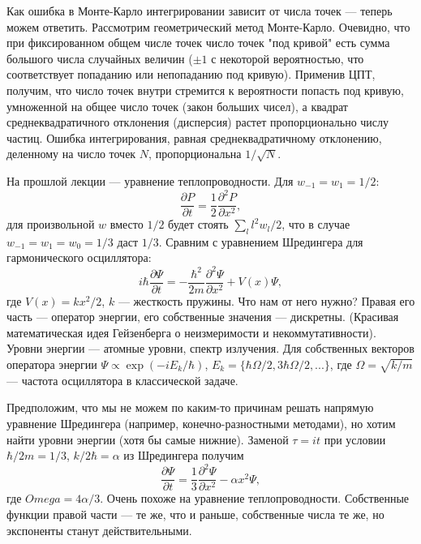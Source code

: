 \documentclass{book}
\begin{document}
Как ошибка в Монте-Карло интегрировании зависит от числа точек --- теперь можем ответить.
Рассмотрим геометрический метод Монте-Карло. Очевидно, что при фиксированном общем числе точек
число точек "под кривой" есть сумма большого числа случайных величин ($\pm 1$ с некоторой вероятностью, что
соответствует попаданию или непопаданию под кривую). Применив ЦПТ, получим, что число точек внутри
стремится к вероятности попасть под кривую, умноженной на общее число точек (закон больших чисел), а квадрат
среднеквадратичного отклонения (дисперсия) растет пропорционально числу частиц. Ошибка
интегрирования, равная среднеквадратичному отклонению, деленному на число точек $N$,
пропорциональна $1 / \sqrt{N}$.

На прошлой лекции --- уравнение теплопроводности. Для $w_{-1} = w_1 = 1/2$:
\begin{equation}
    \frac{\partial P}{\partial t} = \frac{1}{2} \frac{\partial^2 P}{\partial x^2},
\end{equation}
для произвольной $w$ вместо $1/2$ будет стоять $\sum_l l^2 w_l / 2$, что в случае $w_{-1} = w_1 =
w_0 = 1/3$ даст $1/3$. Сравним с уравнением Шредингера для гармонического осциллятора:
\begin{equation}
    i \hbar \frac{\partial \Psi}{\partial t} = - \frac{\hbar^2}{2 m} \frac{\partial^2 \Psi}{\partial x^2} + V(x) \Psi,
\end{equation}
где $V(x) = k x^2 / 2$, $k$ --- жесткость пружины.
Что нам от него нужно? Правая его часть --- оператор энергии, его собственные значения ---
дискретны. (Красивая математическая идея Гейзенберга о неизмеримости и некоммутативности). Уровни
энергии --- атомные уровни, спектр излучения. Для собственных векторов оператора энергии $\Psi
\propto \exp(-i E_k / \hbar)$, $E_k = \{\hbar \Omega / 2, 3 \hbar \Omega / 2, ...\}$, где $\Omega =
\sqrt{k / m}$ --- частота осциллятора в классической задаче.

Предположим, что мы не можем по каким-то причинам решать напрямую уравнение Шредингера (например,
конечно-разностными методами), но хотим найти уровни энергии (хотя бы самые нижние). Заменой $\tau
= i t$ при условии $\hbar / 2 m = 1 / 3$, $k / 2 \hbar = \alpha$ из Шредингера получим
\begin{equation}
    \frac{\partial \Psi}{\partial t} = \frac{1}{3} \frac{\partial^2 \Psi}{\partial x^2} - \alpha
    x^2 \Psi,
\end{equation}
где $Omega = 4 \alpha / 3$.
Очень похоже на уравнение теплопроводности.
Собственные функции правой части --- те же, что и раньше, собственные числа те же, но экспоненты
станут действительными.
\end{document}
